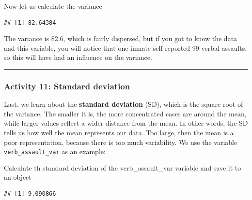 \documentclass[
]{book}
\newenvironment{Shaded}{\begin{snugshade}}{\end{snugshade}}
\newcommand{\AttributeTok}[1]{\textcolor[rgb]{0.77,0.63,0.00}{#1}}
\newcommand{\ConstantTok}[1]{\textcolor[rgb]{0.00,0.00,0.00}{#1}}
\newcommand{\FunctionTok}[1]{\textcolor[rgb]{0.00,0.00,0.00}{#1}}
\newcommand{\NormalTok}[1]{#1}
\newcommand{\OtherTok}[1]{\textcolor[rgb]{0.56,0.35,0.01}{#1}}
\newcommand{\SpecialCharTok}[1]{\textcolor[rgb]{0.00,0.00,0.00}{#1}}
\begin{document}
Now let us calculate the variance

\begin{Shaded}
\end{Shaded}

\begin{verbatim}
## [1] 82.64384
\end{verbatim}

The variance is 82.6, which is fairly dispersed, but if you got to know the data and this variable, you will notice that one inmate self-reported 99 verbal assaults, so this will have had an influence on the variance.

\begin{center}\rule{0.5\linewidth}{0.5pt}\end{center}

\hypertarget{activity-11-standard-deviation}{%
\subsubsection{Activity 11: Standard deviation}\label{activity-11-standard-deviation}}

Last, we learn about the \textbf{standard deviation} (SD), which is the square root of the variance. The smaller it is, the more concentrated cases are around the mean, while larger values reflect a wider distance from the mean. In other words, the SD tells us how well the mean represents our data. Too large, then the mean is a poor representation, because there is too much variability. We use the variable \texttt{verb\_assault\_var} as an example:

Calculate th standard deviation of the verb\_assault\_var variable and save it to an object

\begin{Shaded}
\end{Shaded}

\begin{verbatim}
## [1] 9.090866
\end{verbatim}
\end{document}
